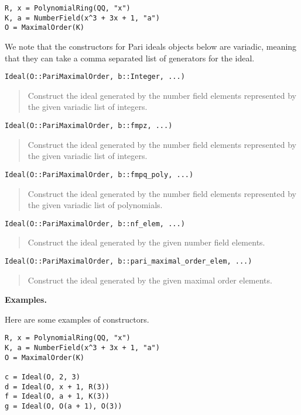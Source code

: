 \documentclass[a4paper,10pt]{article}
\newcommand{\desc}[1]{\vspace{-3mm}\begin{quote}#1\end{quote}}
\begin{document}
{{\begin{lstlisting}
R, x = PolynomialRing(QQ, "x")
K, a = NumberField(x^3 + 3x + 1, "a")
O = MaximalOrder(K)
\end{lstlisting}

We note that the constructors for Pari ideals objects below are variadic,
meaning that they can take a comma separated list of generators for the ideal.

\begin{lstlisting}
Ideal(O::PariMaximalOrder, b::Integer, ...)
\end{lstlisting}

\desc{Construct the ideal generated by the number field elements represented
by the given variadic list of integers.}

\begin{lstlisting}
Ideal(O::PariMaximalOrder, b::fmpz, ...)
\end{lstlisting}

\desc{Construct the ideal generated by the number field elements represented
by the given variadic list of integers.}

\begin{lstlisting}
Ideal(O::PariMaximalOrder, b::fmpq_poly, ...)
\end{lstlisting}

\desc{Construct the ideal generated by the number field elements represented
by the given variadic list of polynomials.}

\begin{lstlisting}
Ideal(O::PariMaximalOrder, b::nf_elem, ...)
\end{lstlisting}

\desc{Construct the ideal generated by the given number field elements.}

\begin{lstlisting}
Ideal(O::PariMaximalOrder, b::pari_maximal_order_elem, ...)
\end{lstlisting}

\desc{Construct the ideal generated by the given maximal order elements.}

\textbf{Examples.}

Here are some examples of constructors.

\begin{lstlisting}
R, x = PolynomialRing(QQ, "x")
K, a = NumberField(x^3 + 3x + 1, "a")
O = MaximalOrder(K)

c = Ideal(O, 2, 3)
d = Ideal(O, x + 1, R(3))
f = Ideal(O, a + 1, K(3))
g = Ideal(O, O(a + 1), O(3))
\end{lstlisting}

}}
\end{document}

